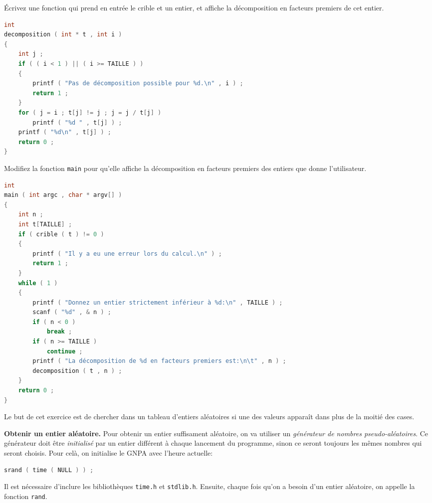 \question Écrivez une fonction qui prend en entrée le crible et un
entier, et affiche la décomposition en facteurs premiers de cet
entier.


\begin{solution}
  \begin{lstlisting}[language=C]
int
decomposition ( int * t , int i )
{
    int j ;
    if ( ( i < 1 ) || ( i >= TAILLE ) )
    {
        printf ( "Pas de décomposition possible pour %d.\n" , i ) ;
        return 1 ;
    }
    for ( j = i ; t[j] != j ; j = j / t[j] )
        printf ( "%d " , t[j] ) ;
    printf ( "%d\n" , t[j] ) ;
    return 0 ;
}
  \end{lstlisting}
\end{solution}

\question Modifiez la fonction \texttt{main} pour qu'elle affiche la
décomposition en facteurs premiers des entiers que donne
l'utilisateur.

\begin{solution}
  \begin{lstlisting}[language=C]
int
main ( int argc , char * argv[] )
{
    int n ;
    int t[TAILLE] ;
    if ( crible ( t ) != 0 )
    {
        printf ( "Il y a eu une erreur lors du calcul.\n" ) ;
        return 1 ;
    }
    while ( 1 )
    {
        printf ( "Donnez un entier strictement inférieur à %d:\n" , TAILLE ) ;
        scanf ( "%d" , & n ) ;
        if ( n < 0 )
            break ;
        if ( n >= TAILLE )
            continue ;
        printf ( "La décomposition de %d en facteurs premiers est:\n\t" , n ) ;
        decomposition ( t , n ) ;
    }
    return 0 ;
}
  \end{lstlisting}
\end{solution}


Le but de cet exercice est de chercher dans un tableau d'entiers
aléatoires si une des valeurs apparaît dans plus de la moitié des
cases.

\begin{fminipage}{0.9\textwidth}
  \textbf{Obtenir un entier aléatoire.} Pour obtenir un entier
  suffisament aléatoire, on va utiliser un \emph{générateur de nombres
    pseudo-aléatoires}. Ce générateur doit être \emph{initialisé} par
  un entier différent à chaque lancement du programme, sinon ce seront
  toujours les mêmes nombres qui seront choisis. Pour celà, on
  initialise le GNPA avec l'heure actuelle:
  \begin{lstlisting}[language=C]
    srand ( time ( NULL ) ) ;
  \end{lstlisting}
  Il est nécessaire d'inclure les bibliothèques \texttt{time.h} et
  \texttt{stdlib.h}. Ensuite, chaque fois qu'on a besoin d'un entier
  aléatoire, on appelle la fonction \texttt{rand}.
\end{fminipage}

